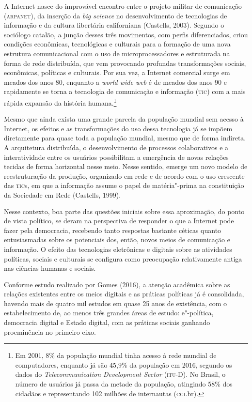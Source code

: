 \noindent{}A Internet nasce do improvável encontro entre o projeto militar de
comunicação (\textsc{arpanet}), da inserção da \emph{big science} no
desenvolvimento de tecnologias de informação e da cultura libertária
californiana (Castells, 2003). Segundo o sociólogo catalão, a junção
desses três movimentos, com perfis diferenciados, criou condições
econômicas, tecnológicas e culturais para a formação de uma nova
estrutura comunicacional com o uso de microprocessadores e estruturada
na forma de rede distribuída, que vem provocando profundas
transformações sociais, econômicas, políticas e culturais. Por sua vez,
a Internet comercial surge em meados dos anos 80, enquanto a \emph{world
wide web} é de meados dos anos 90 e rapidamente se torna a tecnologia de
comunicação e informação (\textsc{tic}) com a mais rápida expansão da história
humana.\footnote{Em 2001, 8\% da população mundial tinha acesso à rede
  mundial de computadores, enquanto já são 45,9\% da população em 2016,
  segundo os dados do \emph{Telecommunication Development Sector}
  (\textsc{itu}-D). No Brasil, o número de usuários já passa da metade da
  população, atingindo 58\% dos cidadãos e representando 102 milhões de
  internautas (\textsc{cgi}.br).}

Mesmo que ainda exista uma grande parcela da população mundial sem
acesso à Internet, os efeitos e as transformações do uso dessa
tecnologia já se impõem diretamente para quase toda a população mundial,
mesmo que de forma indireta. A arquitetura distribuída, o
desenvolvimento de processos colaborativos e a interatividade entre os
usuários possibilitam a emergência de novas relações tecidas de forma
horizontal nesse meio. Nesse sentido, emerge um novo modelo de
reestruturação da produção, organizado em rede e de acordo com o uso
crescente das \textsc{tic}s, em que a informação assume o papel de matéria"-prima
na constituição da Sociedade em Rede (Castells, 1999).

Nesse contexto, boa parte das questões iniciais sobre essa aproximação,
do ponto de vista político, se deram na perspectiva de responder o que a
Internet pode fazer pela democracia, recebendo tanto respostas bastante
céticas quanto entusiasmadas sobre os potenciais dos, então, novos meios
de comunicação e informação. O efeito das tecnologias eletrônicas e
digitais sobre as atividades políticas, sociais e culturais se configura
como preocupação relativamente antiga nas ciências humanas e sociais.

Conforme estudo realizado por Gomes (2016), a atenção acadêmica sobre as
relações existentes entre os meios digitais e as práticas políticas já é
consolidada, havendo mais de quatro mil estudos em quase 25 anos de
existência, com o estabelecimento de, ao menos três grandes áreas de
estudo: e"-política, democracia digital e Estado digital, com as práticas
sociais ganhando proeminência no primeiro eixo.

